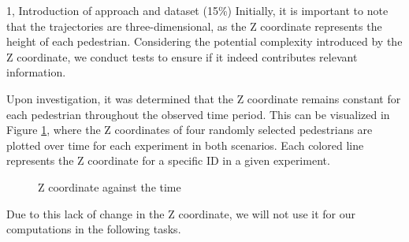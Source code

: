 \begin{task}{1, Introduction of approach and dataset (15\%)}
Initially, it is important to note that the trajectories are three-dimensional, as the Z coordinate represents the height of each pedestrian. Considering the potential complexity introduced by the Z coordinate, we conduct tests to ensure if it indeed contributes relevant information.

Upon investigation, it was determined that the Z coordinate remains constant for each pedestrian throughout the observed time period. This can be visualized in Figure \ref{z_not_changing}, where the Z coordinates of four randomly selected pedestrians are plotted over time for each experiment in both scenarios. Each colored line represents the Z coordinate for a specific ID in a given experiment.
\begin{figure}[H]
\centering
{}
\caption{Z coordinate against the time}
\label{z_not_changing}
\end{figure}

Due to this lack of change in the Z coordinate, we will not use it for our computations in the following tasks.


\end{task}
